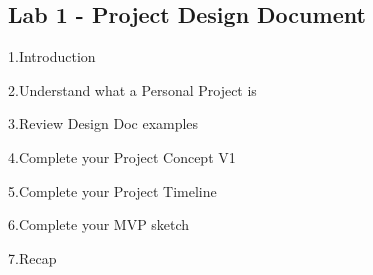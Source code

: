 \documentclass[
]{book}
\begin{document}
\hypertarget{lab-1---project-design-document}{%
\subsection{Lab 1 - Project Design Document}\label{lab-1---project-design-document}}

1.Introduction

2.Understand what a Personal Project is

3.Review Design Doc examples

4.Complete your Project Concept V1

5.Complete your Project Timeline

6.Complete your MVP sketch

7.Recap

  
\end{document}
